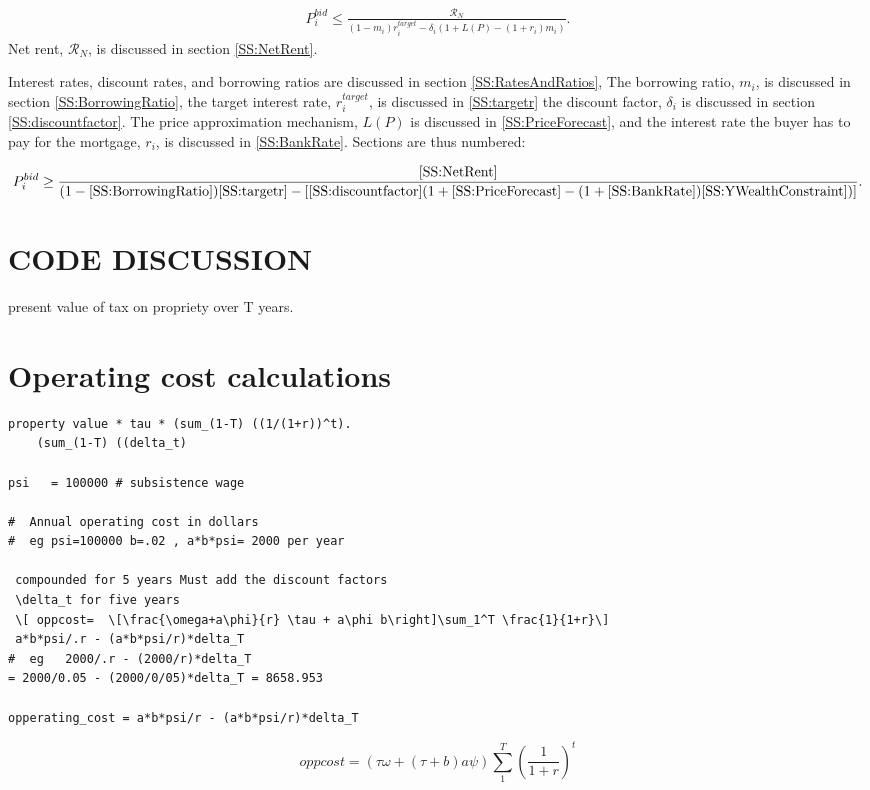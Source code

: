 \begin{align}
P_i^{bid} \le   \frac{\mathcal{R}_N}{(1-m_i)r_i^{target}- \delta_i \left(1+L(P)- (1+ r_i)m_i\right)}.
\end{align}
Net rent, $\mathcal{R}_N$, is discussed in section \ref{SS:NetRent}. 

Interest rates, discount rates, and borrowing ratios are discussed in section \ref{SS:RatesAndRatios},
The borrowing ratio, $m_i$, is discussed in section \ref{SS:BorrowingRatio}, the target interest rate, $r_i^{target}$, is discussed in \ref{SS:targetr} the discount factor, $\delta_i$ is discussed in section \ref{SS:discountfactor}. The price approximation mechanism, $L(P)$ is discussed in \ref{SS:PriceForecast}, and the interest rate the buyer has to pay for the mortgage, $r_i$, is discussed in \ref{SS:BankRate}. Sections are thus numbered: 

\begin{align*}
P_i^{bid} \ge   \frac{\ref{SS:NetRent}} {(1-\ref{SS:BorrowingRatio})\ref{SS:targetr}-
\left[ \ref{SS:discountfactor}(1+\ref{SS:PriceForecast}- (1+\ref{SS:BankRate})\ref{SS:YWealthConstraint})\right]}. 
\end{align*}


\section{CODE DISCUSSION}
present value of tax on propriety over T years. 

\section{Operating cost calculations}
\begin{verbatim}
property value * tau * (sum_(1-T) ((1/(1+r))^t).    
    (sum_(1-T) ((delta_t)

psi   = 100000 # subsistence wage
    
#  Annual operating cost in dollars  
#  eg psi=100000 b=.02 , a*b*psi= 2000 per year 

 compounded for 5 years Must add the discount factors  
 \delta_t for five years 
 \[ oppcost=  \[\frac{\omega+a\phi}{r} \tau + a\phi b\right]\sum_1^T \frac{1}{1+r}\]
 a*b*psi/.r - (a*b*psi/r)*delta_T
#  eg   2000/.r - (2000/r)*delta_T 
= 2000/0.05 - (2000/0/05)*delta_T = 8658.953

opperating_cost = a*b*psi/r - (a*b*psi/r)*delta_T 
\end{verbatim}

\[ oppcost=  \left(\tau\omega  +(\tau+b)a\psi\right)\sum_1^T \left(\frac{1}{1+r}\right)^t\]

